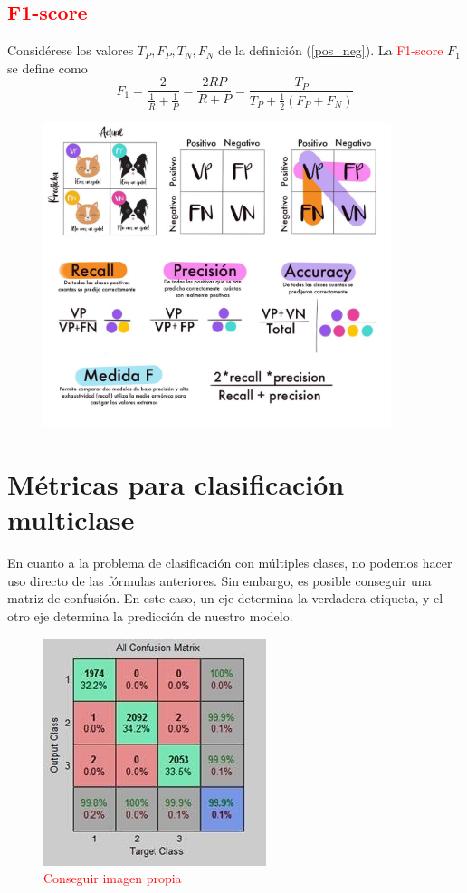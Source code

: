 \subsection{\textcolor{red}{F1-score}}
\begin{definition}[\textcolor{red}{F1-score}]
    Considérese los valores $T_P, F_P, T_N, F_N$ de la definición (\ref{pos_neg}). La \textcolor{red}{F1-score} $F_1$ se define como 
    \begin{equation}
        F_1  = \frac{2}{\frac{1}{R} + \frac{1}{P}} = \frac{2RP}{R + P} = \frac{T_P}{T_P + \frac{1}{2}(F_P + F_N)}
    \end{equation}
\end{definition}
\begin{figure}[H]
    \centering
    \includegraphics[width=4in]{../cap5_experimentos/src/metricas.jpeg}
\end{figure}
\section{Métricas para clasificación multiclase}
En cuanto a la problema de clasificación con múltiples clases, no podemos hacer uso directo de las fórmulas anteriores. Sin embargo, es posible conseguir una matriz de confusión. En este caso, un eje determina la verdadera etiqueta, y el otro eje determina la predicción de nuestro modelo.

\begin{figure}[H]
    \centering
    \includegraphics{../cap5_experimentos/src/confision_multiclase.png}
    \caption{\textcolor{red}{Conseguir imagen propia}}
\end{figure}
